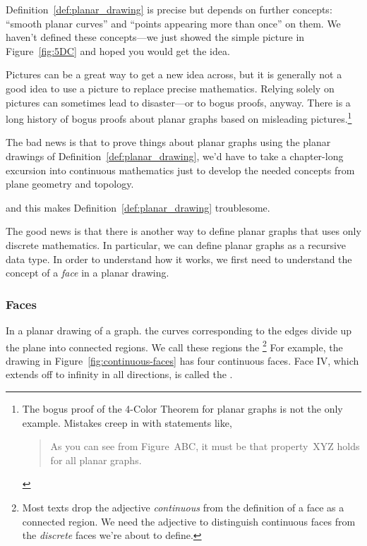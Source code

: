 Definition~\ref{def:planar_drawing} is precise but depends on
further concepts: ``smooth planar curves'' and ``points appearing more
than once'' on them.  We haven't defined these concepts---we just
showed the simple picture in Figure~\ref{fig:5DC} and hoped you would
get the idea.

Pictures can be a great way to get a new idea across, but it is generally
not a good idea to use a picture to replace precise mathematics.  Relying
solely on pictures can sometimes lead to disaster---or to bogus proofs,
anyway.  There is a long history of bogus proofs about planar graphs based
on misleading pictures.\footnote{The bogus proof of the
  4-Color Theorem for planar graphs is not the only example.  Mistakes
  creep in with statements like,
\begin{quote}
    As you can see from Figure~ABC, it must be that property~XYZ holds
    for all planar graphs.
\end{quote}}

The bad news is that to prove things about planar graphs using the planar
drawings of Definition~\ref{def:planar_drawing}, we'd have to take a chapter-long
excursion into continuous mathematics just to develop the needed concepts
from plane geometry and topology.
\begin{editingnotes} and this makes
  Definition~\ref{def:planar_drawing} troublesome.
\end{editingnotes}
The good news is that there is another way to define planar graphs that
uses only discrete mathematics.  In particular, we can define planar
graphs as a recursive data type.  In order to understand how it works, we
first need to understand the concept of a \emph{face} in a planar drawing.

\subsubsection{Faces}

In a planar drawing of a graph. the curves corresponding to the edges
divide up the plane into connected regions.  We call these regions the
\footnote{Most texts drop the adjective
  \emph{continuous} from the definition of a face as a connected region.
  We need the adjective to distinguish continuous faces from the
  \emph{discrete} faces we're about to define.}  For example, the drawing
in Figure~\ref{fig:continuous-faces} has four continuous faces.  Face IV,
which extends off to infinity in all directions, is called the
.


